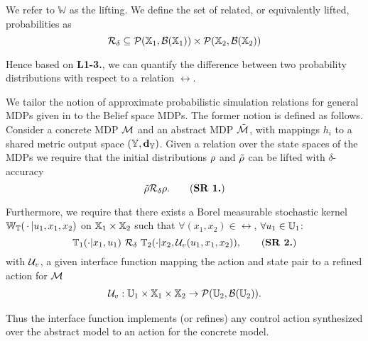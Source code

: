 \documentclass{ifacconf}
\begin{document}
We refer to  $\mathbb W$ as the lifting. We define 
the set of related, or equivalently lifted, probabilities as 
	\[\relax\mathcal{R}_\delta\subseteq \mathcal{P}({\mathbb{X}}_1,\mathcal B({\mathbb{X}}_1))\times \mathcal{P}({\mathbb{X}}_2,\mathcal B({\mathbb{X}}_2))\] 


Hence based on \textbf{L1-3.}, we can quantify the difference between two probability distributions with respect to a relation $\rel$.

 
We tailor the   notion of approximate probabilistic simulation relations for general MDPs given in \citep{haesaert2017verification} to the Belief space MDPs.
  The former notion is defined as follows. 
Consider a concrete MDP $\mathcal{M}$ and an abstract  MDP $\tilde{\mathcal{M}}$, with mappings $h_i$ to a shared {metric} output space  $({\mathbb{Y}},\mathbf{d}_{\mathbb{Y}})$.  
Given a relation over the state spaces of the MDPs we require that the initial distributions $\rho$ and $\tilde{\rho}$ can be lifted with $\delta$-accuracy
\begin{equation}
\tilde\init \bar \rel_\delta \init.
	\tag{\textbf{SR 1.}}
\end{equation}
  
Furthermore, we require that there exists a Borel measurable stochastic kernel $\mathbb{W}_{\mathbb{T}}(\,\cdot\,{\mid} u_1,x_1,x_2)$ on ${\mathbb{X}}_1\times{\mathbb{X}}_2$ such that $\forall (x_1,x_2)\in \rel$, $\forall u_1\in{\mathbb{U}}_1$:
\begin{equation}\mathbb T_1(\cdot| x_1, u_1)\ \bar \rel_\delta \  \mathbb T_2(\cdot| x_2, \InF(u_1,x_1,x_2)),\tag{\textbf{SR 2.}}\end{equation} with $\mathcal{U}_{v}$, a given interface function mapping the action and state pair to a refined action for $\mathcal{M}$
\begin{align*}\mathcal{U}_{v}: {\mathbb{U}}_1\times {\mathbb{X}}_1\times{\mathbb{X}}_2 \rightarrow \mathcal{P}({\mathbb{U}}_2,\mathcal B({\mathbb{U}}_2)). \end{align*}

Thus the interface function implements (or refines) any control action synthesized over the abstract model to an action for the concrete model.
\end{document}
